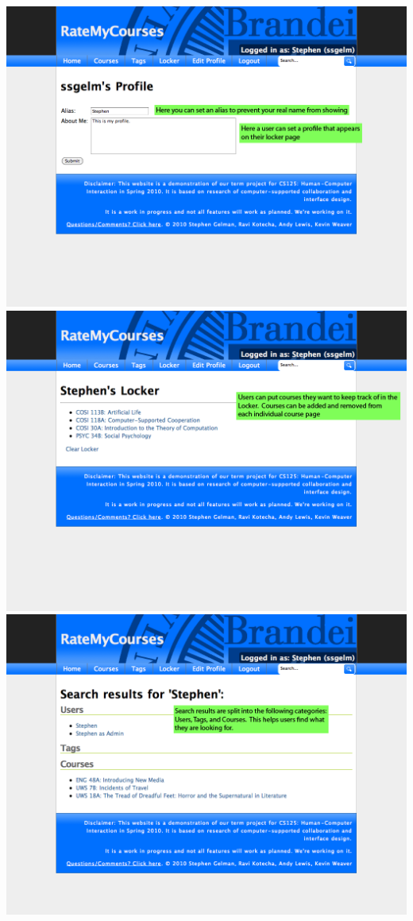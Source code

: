 \documentclass[12pt]{report}
\begin{document}
\includegraphics[width=\textwidth]{screen-4.png}
\includegraphics[width=\textwidth]{screen-5.png}
\includegraphics[width=\textwidth]{screen-6.png}
\end{document}

